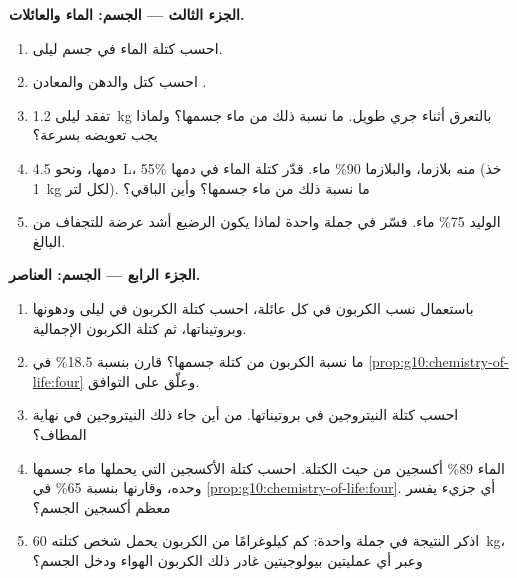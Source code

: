 \begin{problem}
\medskip
\noindent\textbf{الجزء الثالث --- الجسم: الماء والعائلات.}
\begin{enumerate}[resume]
  \item احسب كتلة الماء في جسم ليلى.
  \item احسب كتل  والدهن والمعادن .
  \item تفقد ليلى \qty{1.2}{kg} بالتعرق أثناء جري طويل. ما نسبة ذلك
        من ماء جسمها؟ ولماذا يجب تعويضه بسرعة؟
  \item دمها، ونحو \qty{4.5}{L}، 55\% منه بلازما، والبلازما 90\% ماء.
        قدّر كتلة الماء في دمها (خذ \qty{1}{kg} لكل لتر). ما نسبة ذلك
        من ماء جسمها؟ وأين الباقي؟
  \item الوليد 75\% ماء. فسّر في جملة واحدة لماذا يكون الرضيع أشد
        عرضة للتجفاف من البالغ.
\end{enumerate}

\medskip
\noindent\textbf{الجزء الرابع --- الجسم: العناصر.}
\begin{enumerate}[resume]
  \item باستعمال نسب الكربون في كل عائلة، احسب كتلة الكربون في
         ليلى ودهونها وبروتيناتها، ثم كتلة الكربون
        الإجمالية.
  \item ما نسبة الكربون من كتلة جسمها؟ قارن بنسبة 18.5\% في
        \cref{prop:g10:chemistry-of-life:four} وعلّق على التوافق.
  \item احسب كتلة النيتروجين في بروتيناتها. من أين جاء ذلك النيتروجين
        في نهاية المطاف؟
  \item الماء 89\% أكسجين من حيث الكتلة. احسب كتلة الأكسجين التي
        يحملها ماء جسمها وحده، وقارنها بنسبة 65\% في
        \cref{prop:g10:chemistry-of-life:four}. أي جزيء يفسر معظم
        أكسجين الجسم؟
  \item اذكر النتيجة في جملة واحدة: كم كيلوغرامًا من الكربون يحمل شخص
        كتلته \qty{60}{kg}، وعبر أي عمليتين بيولوجيتين غادر ذلك
        الكربون الهواء ودخل الجسم؟
\end{enumerate}
\end{problem}

